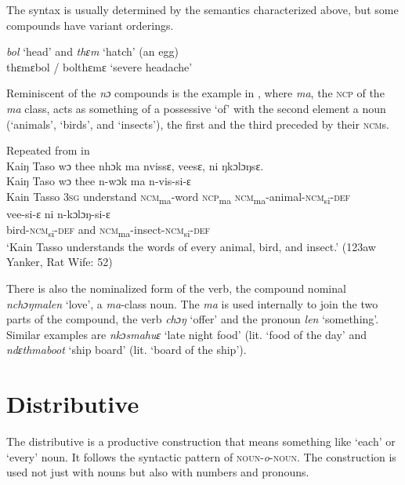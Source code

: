 
The syntax is usually determined by the semantics characterized above, but some compounds have variant orderings.

\TabPositions{4cm}

\ea%
    \label{ex:188}  \textit{bol} ‘head' and \textit{thɛm} ‘hatch' (an egg)\\
    
    thɛmɛbol / bolthɛmɛ \tab ‘severe headache'
\z

Reminiscent of the \textit{nɔ} compounds is the example in , where \textit{ma}, the \textsc{ncp} of the \textit{ma} class, acts as something of a possessive ‘of' with the second element a noun (‘animals', ‘birds', and ‘insects'), the first and the third preceded by their \textsc{ncm}s.

\ea%
    \label{ex:189}
    Repeated from  in \\
    Kaiŋ Taso wɔ thee nhɔk ma nvissɛ, veesɛ, ni ŋkɔlɔŋsɛ.\\
    \gll Kaiŋ    Taso    wɔ    thee      n-wɔk      ma    n-vis-si-ɛ\\
    Kain    Tasso    \textsc{3sg}  understand  \textsc{ncm}\textsubscript{ma}{}-word  \textsc{ncp}\textsubscript{ma}    \textsc{ncm}\textsubscript{ma}{}-animal-\textsc{ncm}\textsubscript{si}{}-\textsc{def}\\
    \gll vee-si-ɛ        ni    n-kɔlɔŋ-si-ɛ\\
    bird-\textsc{ncm}\textsubscript{si}{}-\textsc{def}  and  \textsc{ncm}\textsubscript{ma}{}-insect-\textsc{ncm}\textsubscript{si}{}-\textsc{def}\\
    ‎\glt ‘Kain Tasso understands the words of every animal, bird, and insect.' (123aw Yanker, Rat Wife: 52)
\z

There is also the nominalized form of the verb, the compound nominal \textit{nchɔŋmalen} ‘love', a \textit{ma}\nobreakdash-class noun. The \textit{ma} is used internally to join the two parts of the compound, the verb \textit{chɔŋ} ‘offer' and the pronoun \textit{len} ‘something'. Similar examples are \textit{nkɔsmahuɛ} ‘late night food' (lit. ‘food of the day' and \textit{ndɛthmaboot} ‘ship board' (lit. ‘board of the ship').

\section{Distributive}
\label{sec:7.4}\hypertarget{Toc115517811}{}
The distributive is a productive construction that means something like ‘each' or ‘every' noun. It follows the syntactic pattern of \textsc{noun}{}-\textit{o}{}-\textsc{noun}. The construction is used not just with nouns but also with numbers and pronouns.

